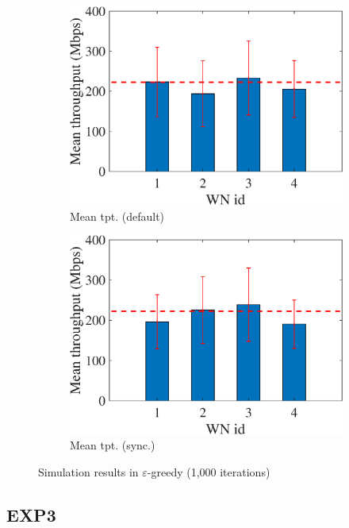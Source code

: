 \documentclass[preprint,12pt]{article}
\begin{document}
\begin{figure}[h!]
\begin{subfigure}[b]{.33\textwidth}
		\includegraphics[width=\textwidth]{images/mean_tpt_EG}
		\caption{Mean tpt. (default)}\label{fig:mean_tpt_EG}
	\end{subfigure}
	\begin{subfigure}[b]{.33\textwidth}
		\includegraphics[width=\textwidth]{images/mean_tpt_OEG}
		\caption{Mean tpt. (sync.)}\label{fig:mean_tpt_OEG}
	\end{subfigure}
	\caption{Simulation results in $\varepsilon$-greedy (1,000 iterations)}
	\label{fig:e_greedy}
\end{figure}

\subsection{EXP3}
\label{section:exp3}
\end{document}
